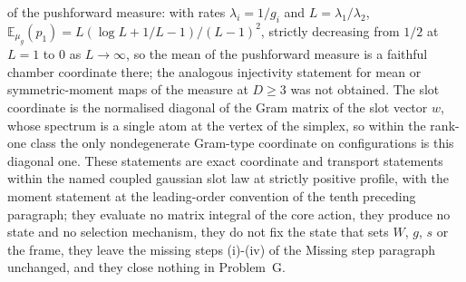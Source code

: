 of the pushforward measure: with rates \(\lambda_{i}=1/g_{i}\) and \(L=\lambda_{1}/\lambda_{2}\), \(\mathbb{E}_{\mu_{g}}(p_{1})=L(\log L+1/L-1)/(L-1)^{2}\), strictly decreasing from \(1/2\) at \(L=1\) to \(0\) as \(L\to\infty\), so the mean of the pushforward measure is a faithful chamber coordinate there; the analogous injectivity statement for mean or symmetric-moment maps of the measure at \(D\ge3\) was not obtained. The slot coordinate is the normalised diagonal of the Gram matrix of the slot vector \(w\), whose spectrum is a single atom at the vertex of the simplex, so within the rank-one class the only nondegenerate Gram-type coordinate on configurations is this diagonal one. These statements are exact coordinate and transport statements within the named coupled gaussian slot law at strictly positive profile, with the moment statement at the leading-order convention of the tenth preceding paragraph; they evaluate no matrix integral of the core action, they produce no state and no selection mechanism, they do not fix the state that sets \(W\), \(g\), \(s\) or the frame, they leave the missing steps (i)-(iv) of the Missing step paragraph unchanged, and they close nothing in Problem~G.
